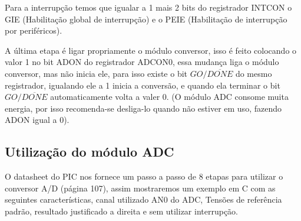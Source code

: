 \documentclass{article}
\begin{document}
Para a interrupção temos que igualar a 1 mais 2 bits do registrador INTCON o GIE (Habilitação global de interrupção) e o PEIE (Habilitação de interrupção por periféricos).\par

A última etapa é ligar propriamente o módulo conversor, isso é feito colocando o valor 1 no bit ADON do registrador ADCON0, essa mudança liga o módulo conversor, mas não inicia ele, para isso existe o bit $GO/\overline{DONE}$ do mesmo registrador, igualando ele a 1 inicia a conversão, e quando ela terminar o bit $GO/\overline{DONE}$ automaticamente volta a valer 0. (O módulo ADC consome muita energia, por isso recomenda-se desliga-lo quando não estiver em uso, fazendo ADON igual a 0).\par


\subsection{Utilização do módulo ADC}
O datasheet do PIC \cite{PICDatasheet} nos fornece um passo a passo de 8 etapas para utilizar o conversor A/D (página 107), assim mostraremos um exemplo em C com as seguintes características, canal utilizado AN0 do ADC, Tensões de referência padrão, resultado justificado a direita e sem utilizar interrupção.
\end{document}
